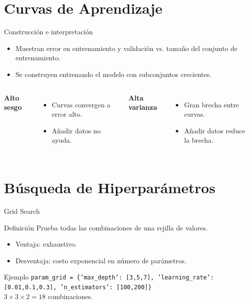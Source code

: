 \documentclass[aspectratio=169, 10pt, xcolor=table]{beamer}
\begin{document}
\section{Curvas de Aprendizaje}

\begin{frame}{Construcción e interpretación}
    \begin{itemize}
        \item Muestran error en entrenamiento y validación vs. tamaño del conjunto de entrenamiento.
        \item Se construyen entrenando el modelo con subconjuntos crecientes.
    \end{itemize}
    \begin{columns}[t]
        \textbf{Alto sesgo}
        \begin{itemize}
            \item Curvas convergen a error alto.
            \item Añadir datos no ayuda.
        \end{itemize}
        \textbf{Alta varianza}
        \begin{itemize}
            \item Gran brecha entre curvas.
            \item Añadir datos reduce la brecha.
        \end{itemize}
    \end{columns}
\end{frame}

\section{Búsqueda de Hiperparámetros}

\begin{frame}{Grid Search}
    \begin{block}{Definición}
        Prueba todas las combinaciones de una rejilla de valores.
    \end{block}
    \begin{itemize}
        \item Ventaja: exhaustivo.
        \item Desventaja: costo exponencial en número de parámetros.
    \end{itemize}
    \begin{exampleblock}{Ejemplo}
        \texttt{param\_grid = \{'max\_depth': [3,5,7], 'learning\_rate': [0.01,0.1,0.3], 'n\_estimators': [100,200]\}} \\
        $3\times3\times2 = 18$ combinaciones.
    \end{exampleblock}
\end{frame}
\end{document}
